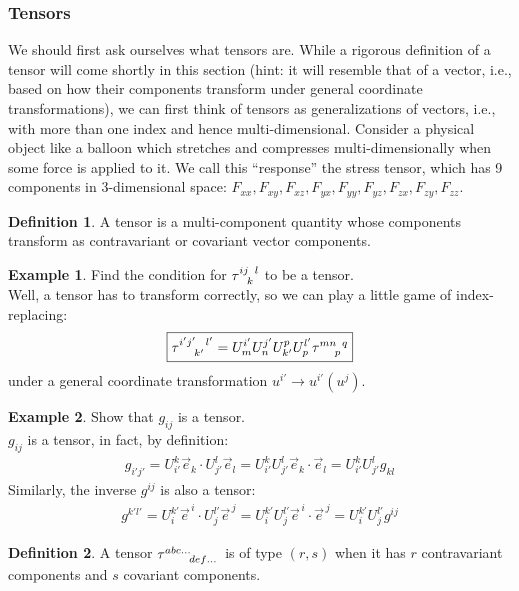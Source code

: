 \documentclass{article}
\theoremstyle{definition}
\newtheorem{defn}{Definition}[section]
\newtheorem{exmp}{Example}[section]
\begin{document}
\subsubsection{Tensors}
We should first ask ourselves what tensors are. While a rigorous definition of a tensor will come shortly in this section (hint: it will resemble that of a vector, i.e., based on how their components transform under general coordinate transformations), we can first think of tensors as generalizations of vectors, i.e., with more than one index and hence multi-dimensional. Consider a physical object like a balloon which stretches and compresses multi-dimensionally when some force is applied to it. We call this ``response'' the stress tensor, which has 9 components in 3-dimensional space: $F_{xx}, F_{xy}, F_{xz}, F_{yx}, F_{yy}, F_{yz}, F_{zx}, F_{zy}, F_{zz}$.  
\begin{defn}
	A tensor is a multi-component quantity whose components transform as contravariant or covariant vector components.
\end{defn}
\begin{exmp}
	Find the condition for $\tensor{\tau}{^{ij}_k^l}$ to be a tensor.\\
	
	Well, a tensor has to transform correctly, so we can play a little game of index-replacing:
	\begin{align*}
	\boxed{\tensor{\tau}{^{i'j'}_{k'}^{l'}} = U^{i'}_mU^{j'}_nU^p_{k'}U^{l'}_p\tensor{\tau}{^{mn}_{p}^{q}}}
	\end{align*}
	under a general coordinate transformation $u^{i'} \rightarrow u^{i'}(u^j)$. 
\end{exmp}
\begin{exmp}
	Show that $g_{ij}$ is a tensor.\\
	
	$g_{ij}$ is a tensor, in fact, by definition:
	\begin{align*}
	\boxed{g_{i'j'} = U^k_{i'}\vec{e}_k \cdot U^l_{j'}\vec{e}_l = U^k_{i'}U^l_{j'}\vec{e}_k \cdot\vec{e}_l = U^k_{i'}U^l_{j'}g_{kl}}
	\end{align*} 
	Similarly, the inverse $g^{ij}$ is also a tensor:
	\begin{align*}
	\boxed{g^{k'l'} = U^{k'}_{i}\vec{e}^{\,i} \cdot U^{l'}_{j}\vec{e}^{\,j} = U^{k'}_iU^{l'}_{j}\vec{e}^{\,i} \cdot\vec{e}^{\,j} = U^{k'}_{i}U^{l'}_{j}g^{ij}}
	\end{align*}
\end{exmp}
\begin{defn}
	A tensor $\tensor{\tau}{^{abc\dots}_{def\dots}}$ is of type $(r,s)$ when it has $r$ contravariant components and $s$ covariant components. 
\end{defn}
\end{document}
